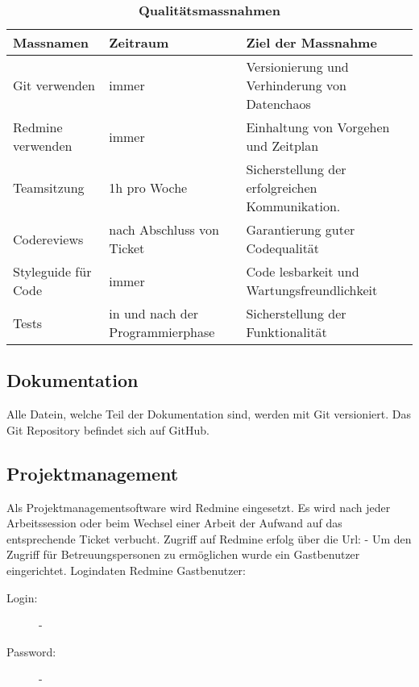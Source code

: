 \documentclass[a4,12pt]{scrartcl}
\begin{document}
\begin{table}[H]
\centering
    \begin{tabular}{@{} p{3cm} p{4cm} p{6cm} @{}}\toprule    
    {Massnamen} & {Zeitraum} & {Ziel der Massnahme}\\ \midrule
    Git verwenden & immer & Versionierung und Verhinderung von Datenchaos\\ \addlinespace
    Redmine verwenden & immer & Einhaltung von Vorgehen und Zeitplan\\ \addlinespace
    Teamsitzung & 1h pro Woche & Sicherstellung der erfolgreichen Kommunikation.\\ \addlinespace
    Codereviews & nach Abschluss von Ticket & Garantierung guter Codequalität  \\ \addlinespace
    Styleguide für Code & immer & Code lesbarkeit und Wartungsfreundlichkeit\\ \addlinespace
    Tests & in und nach der Programmierphase & Sicherstellung der Funktionalität \\
    \bottomrule
    \end{tabular}
\caption{\textbf{Qualitätsmassnahmen}}
\end{table}

\subsection{Dokumentation}
Alle Datein, welche Teil der Dokumentation sind, werden mit Git versioniert. Das Git Repository befindet sich auf GitHub.
\subsection{Projektmanagement}
Als Projektmanagementsoftware wird Redmine eingesetzt. 
Es wird nach jeder Arbeitssession oder beim Wechsel einer Arbeit der Aufwand auf das entsprechende Ticket verbucht.
Zugriff auf Redmine erfolg über die Url: - %
Um den Zugriff für Betreuungspersonen zu ermöglichen wurde ein Gastbenutzer eingerichtet.
\newline
\newline
Logindaten Redmine Gastbenutzer:
\begin{description}
\begin{description}
\item [Login:]
-
\item [Password:]
-
\end{description}
\end{description}
\end{document}
